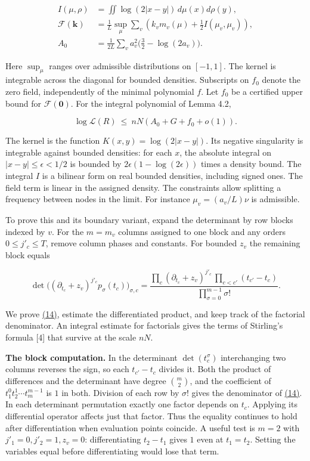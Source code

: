 \documentclass[11pt,a4paper]{article}
\begin{document}
\[
 \begin{aligned}
 I(\mu,\rho)&=\iint\log(2|x-y|)\,d\mu(x)d\rho(y),\\
 \mathcal F(\mathbf k)&=\frac1L\sup_\mu\sum_v
       \left(k_v m_v(\mu)+\tfrac12 I(\mu_v,\mu_v)\right),\\
 A_0&=\frac1{2L}\sum_v a_v^2\big(\tfrac32-\log(2a_v)\big).
 \end{aligned}                                                            \tag{12}\label{eq:12}
\]

Here \(\sup_\mu\) ranges over admissible distributions on \([-1,1]\). The kernel is integrable across the diagonal for bounded densities. Subscripts on \(f_0\) denote the zero field, independently of the minimal polynomial \(f\). Let \(f_0\) be a certified upper bound for \(\mathcal F(\mathbf0)\). For the integral polynomial of Lemma 4.2,

\[
 \log\mathcal L(R)\ \le\ nN(A_0+G+f_0+o(1)).                              \tag{13}\label{eq:13}
\]

The kernel is the function \(K(x,y)=\log(2|x-y|)\). Its negative singularity is integrable against bounded densities: for each \(x\), the absolute integral on \(|x-y|\le\epsilon<1/2\) is bounded by \(2\epsilon(1-\log(2\epsilon))\) times a density bound. The integral \(I\) is a bilinear form on real bounded densities, including signed ones. The field term is linear in the assigned density. The constraints allow splitting a frequency between nodes in the limit. For instance \(\mu_v=(a_v/L)\nu\) is admissible.

To prove this and its boundary variant, expand the determinant by row blocks indexed by \(v\). For the \(m=m_v\) columns assigned to one block and any orders \(0\le j'_c\le T\), remove column phases and constants. For bounded \(z_v\) the remaining block equals

\[
 \det\big((\partial_{t_c}+z_v)^{j'_c}p_\sigma(t_c)\big)_{\sigma,c}
 =\frac{\prod_c(\partial_{t_c}+z_v)^{j'_c}\,
               \prod_{c<c'}(t_{c'}-t_c)}{\prod_{\sigma=0}^{m-1}\sigma!}.   \tag{14}\label{eq:14}
\]

We prove \hyperref[eq:14]{(14)}, estimate the differentiated product, and keep track of the factorial denominator. An integral estimate for factorials gives the terms of Stirling's formula {[}4{]} that survive at the scale \(nN\).

\textbf{The block computation.} In the determinant \(\det(t_c^\sigma)\) interchanging two columns reverses the sign, so each \(t_{c'}-t_c\) divides it. Both the product of differences and the determinant have degree \(\binom m2\), and the coefficient of \(t_1^0t_2^1\cdots t_m^{m-1}\) is \(1\) in both. Division of each row by \(\sigma!\) gives the denominator of \hyperref[eq:14]{(14)}. In each determinant permutation exactly one factor depends on \(t_c\). Applying its differential operator affects just that factor. Thus the equality continues to hold after differentiation when evaluation points coincide. A useful test is \(m=2\) with \(j'_1=0,j'_2=1,z_v=0\): differentiating \(t_2-t_1\) gives \(1\) even at \(t_1=t_2\). Setting the variables equal before differentiating would lose that term.
\end{document}
